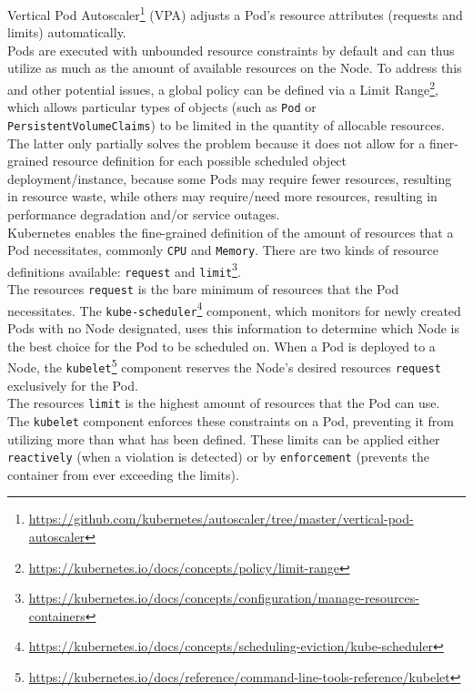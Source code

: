 Vertical Pod Autoscaler\footnote{\url{https://github.com/kubernetes/autoscaler/tree/master/vertical-pod-autoscaler}}
(VPA) adjusts a Pod's resource attributes (requests and limits) automatically. \\ %

Pods are executed with unbounded resource constraints by default and can thus utilize
as much as the amount of available resources on the Node. To address this and
other potential issues, a global policy can be defined via a Limit Range\footnote{\url{https://kubernetes.io/docs/concepts/policy/limit-range}},
which allows particular types of objects (such as \texttt{Pod} or \texttt{PersistentVolumeClaims})
to be limited in the quantity of allocable resources. The latter only partially solves
the problem because it does not allow for a finer-grained resource definition for
each possible scheduled object deployment/instance, because some Pods may
require fewer resources, resulting in resource waste, while others may require/need
more resources, resulting in performance degradation and/or service outages. \\ %
Kubernetes enables the fine-grained definition of the amount of resources that a
Pod necessitates, commonly \texttt{CPU} and \texttt{Memory}. There are two kinds
of resource definitions available: \texttt{request} and \texttt{limit}\footnote{\url{https://kubernetes.io/docs/concepts/configuration/manage-resources-containers}}.
\\ %
The resources \texttt{request} is the bare minimum of resources that the Pod necessitates.
The \texttt{kube-scheduler}\footnote{\url{https://kubernetes.io/docs/concepts/scheduling-eviction/kube-scheduler}}
component, which monitors for newly created Pods with no Node designated, uses this
information to determine which Node is the best choice for the Pod to be scheduled
on. When a Pod is deployed to a Node, the \texttt{kubelet}\footnote{\url{https://kubernetes.io/docs/reference/command-line-tools-reference/kubelet}}
component reserves the Node's desired resources \texttt{request} exclusively for
the Pod. \\ %
The resources \texttt{limit} is the highest amount of resources that the Pod can
use. The \texttt{kubelet} component enforces these constraints on a Pod, preventing
it from utilizing more than what has been defined. These limits can be applied
either \texttt{reactively} (when a violation is detected) or by \texttt{enforcement}
(prevents the container from ever exceeding the limits). \\ %
